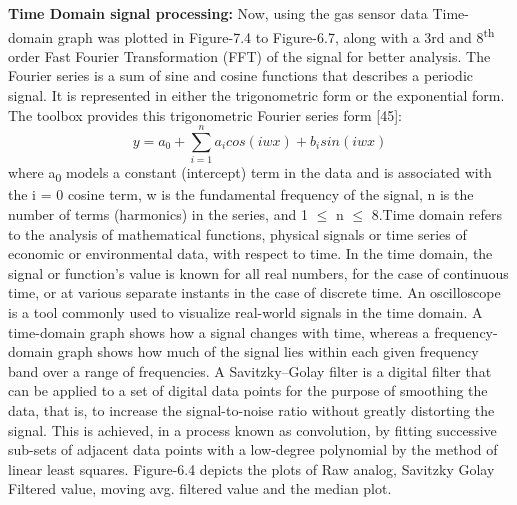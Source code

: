 \textbf{Time Domain signal processing:} Now, using the gas sensor data Time-domain graph was plotted in Figure-7.4 to Figure-6.7,
along with a 3rd and 8\textsuperscript{th} order Fast Fourier Transformation (FFT) of the signal for better analysis. The Fourier series is a sum of sine and cosine functions that describes a periodic signal. It is represented in either the trigonometric form or the exponential form. The toolbox provides this trigonometric Fourier series form [45]:
\begin{equation}\tag{6.5}
y=a_{0}+ \sum _{i=1}^{n}a_{i}cos ( iwx ) +b_{i}sin ( iwx )
\end{equation}
\setlength{\parskip}{8.04pt}
where a\textsubscript{0} models a constant (intercept) term in the data and is associated with the i = 0 cosine term, w is the fundamental frequency of the signal, n is the number of terms (harmonics) in the series, and 1 $ \leq $  n $ \leq $  8.Time domain refers to the analysis of mathematical functions, physical signals or time series of economic or environmental data, with respect to time. In the time domain, the signal or function's value is known for all real numbers, for the case of continuous time, or at various separate instants in the case of discrete time. An oscilloscope is a tool commonly used to visualize real-world signals in the time domain. A time-domain graph shows how a signal changes with time, whereas a frequency-domain graph shows how much of the signal lies within each given frequency band over a range of frequencies. A Savitzky–Golay filter is a digital filter that can be applied to a set of digital data points for the purpose of smoothing the data, that is, to increase the signal-to-noise ratio without greatly distorting the signal. This is achieved, in a process known as convolution, by fitting successive sub-sets of adjacent data points with a low-degree polynomial by the method of linear least squares. Figure-6.4 depicts the plots of Raw analog, Savitzky Golay Filtered value, moving avg. filtered value and the median plot.\par

